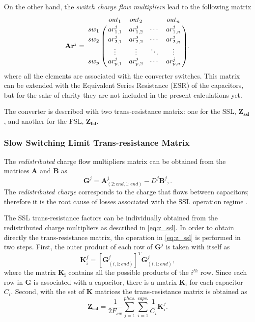 On the other hand, the \emph{switch charge flow multipliers} lead to the following matrix
\begin{equation}
 \mathbf{Ar}^j =
   \bordermatrix { ~ & out_1 & out_2 & ~ & out_n \cr
     sw_1  & ar_{1,1}^j  & ar_{1,2}^j & \cdots & ar_{1,n}^j \cr
     sw_2  & ar_{2,1}^j  & ar_{2,2}^j & \cdots & ar_{2,n}^j \cr
      ~    & \vdots     & \vdots & \ddots & \vdots \cr
     sw_p  & ar_{p,1}^j  & ar_{p,2}^j & \cdots & ar_{p,n}^j \cr}.
 \label{eq:A_matrix}
\end{equation}
where all the elements are associated with the converter switches. This matrix can be extended with the Equivalent Series Resistance (ESR) of the capacitors, but for the sake of clarity they are not included in the present calculations yet.

 The converter is described with two trans-resistance matrix: one for the SSL, $\mathbf{Z_{ssl}}$, and another for the FSL, $\mathbf{Z_{fsl}}$.

\subsubsection{Slow Switching Limit Trans-resistance Matrix}

The \emph{redistributed} charge flow multipliers matrix can be obtained from the
matrices $\mathbf{A}$ and $\mathbf{B}$  as
\begin{equation}
 \mathbf{G}^j = \mathbf{A}_{(2:end,1:end)}^j - D^j \mathbf{B}^j,
 \label{eq:R_matrix}.
\end{equation}
The \emph{redistributed charge} corresponds to the charge that flows between capacitors; therefore it is the root cause of
losses associated with the SSL operation regime \cite{SeemanPhD06}.

The SSL trans-resistance factors can be individually obtained from the redistributed charge multipliers as described in \eqref{eq:z_ssl}. In order to obtain directly the trans-resistance matrix, the operation in \eqref{eq:z_ssl} is performed in  two steps. First, the outer product of  each row of $\mathbf{G}^j$ is taken with itself as
\begin{equation}
 \mathbf{K}_i^j =[\mathbf{G}_{(i,1:end)}^j ]^T \mathbf{G}_{(i,1:end)}^j ,
 \label{eq:K_matrix}
\end{equation}
where the matrix $\mathbf{K_i}$ contains all the possible products of the  $i^{th}$ row. Since each row in $\mathbf{G}$ is associated with a capacitor, there is a matrix $\mathbf{K_i}$ for each capacitor $C_i$.
Second, with the set of $\mathbf{K}$ matrices the trans-resistance matrix is obtained as
\begin{equation}
 \mathbf{Z_{ssl}} = \frac{1}{2 F_{sw}} \sum_{j=1}^{phas.} \sum_{i=1}^{caps.} \frac{1}{C_i} \mathbf{K}_i^j.
 \label{eq:G_ssl}
\end{equation}

